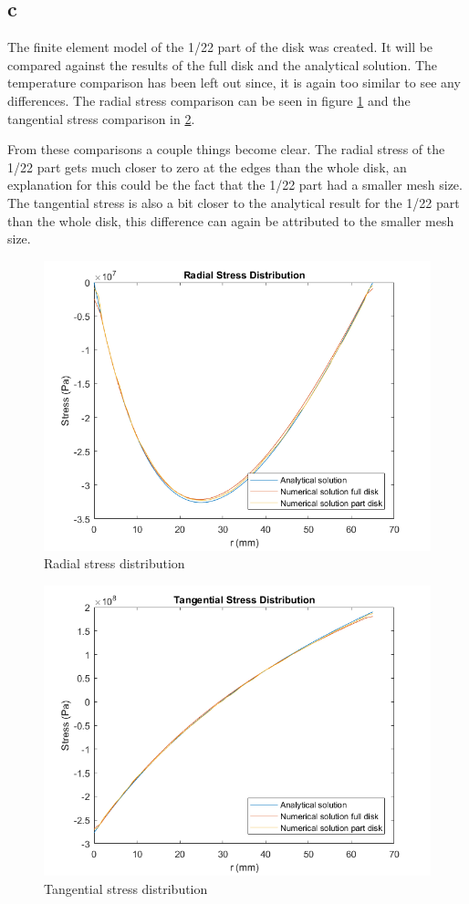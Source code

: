 \subsection{c}

The finite element model of the 1/22 part of the disk was created. It will be compared against the results of the full disk and the analytical solution. The temperature comparison has been left out since, it is again too similar to see any differences. The radial stress comparison can be seen in figure \ref{radtotal} and the tangential stress comparison in \ref{tantotal}.

From these comparisons a couple things become clear. The radial stress of the 1/22 part gets much closer to zero at the edges than the whole disk, an explanation for this could be the fact that the 1/22 part had a smaller mesh size. The tangential stress is also a bit closer to the analytical result for the 1/22 part than the whole disk, this difference can again be attributed to the smaller mesh size. 

\begin{figure} [H]
	\centering
	\includegraphics[width=1\linewidth]{Figures/Radialstresstotal.png}
	\caption{Radial stress distribution}
    \label{radtotal}
\end{figure}

\begin{figure} [H]
	\centering
	\includegraphics[width=1\linewidth]{Figures/tangentialstresstotal.png}
	\caption{Tangential stress distribution}
    \label{tantotal}
\end{figure}

\newpage